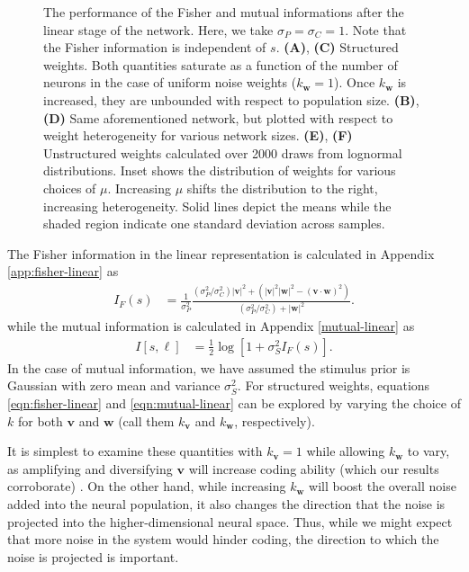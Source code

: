 \documentclass[12pt]{article}
\begin{document}
\begin{figure}[h]
	\caption{The performance of the Fisher and mutual informations after the linear stage of the network. Here, we take $\sigma_P = \sigma_C=1$. Note that the Fisher information is independent of $s$. \textbf{(A)}, \textbf{(C)} Structured weights. Both quantities saturate as a function of the number of neurons in the case of uniform noise weights ($k_{\mathbf{w}}=1$). Once $k_{\mathbf{w}}$ is increased, they are unbounded with respect to population size. \textbf{(B)}, \textbf{(D)} Same aforementioned network, but plotted with respect to weight heterogeneity for various network sizes. \textbf{(E)}, \textbf{(F)} Unstructured weights calculated over 2000 draws from lognormal distributions. Inset shows the distribution of weights for various choices of $\mu$. Increasing $\mu$ shifts the distribution to the right, increasing heterogeneity. Solid lines depict the means while the shaded region indicate one standard deviation across samples.}\label{fig:struct-linear}
\end{figure}
	
	The Fisher information in the linear representation is calculated in Appendix \ref{app:fisher-linear} as 
	\begin{align}
	I_F(s) &= \frac{1}{\sigma_P^2}\frac{\left(\sigma_P^2/\sigma_C^2\right) |\mathbf{v}|^2 +  \left(|\mathbf{v}|^2|\mathbf{w}|^2 - (\mathbf{v}\cdot\mathbf{w})^2\right)}{(\sigma_P^2/\sigma_C^2)+ |\mathbf{w}|^2}. \label{eqn:fisher-linear}
	\end{align}
	while the mutual information is calculated in Appendix \ref{mutual-linear} as
	\begin{align}
	I[s, \boldsymbol{\ell}] &= \frac{1}{2} \log \left[1 + \sigma_S^2 I_F(s)\right]. \label{eqn:mutual-linear}
	\end{align}
	In the case of mutual information, we have assumed the stimulus prior is Gaussian with zero mean and variance $\sigma_S^2$. For structured weights, equations \ref{eqn:fisher-linear} and \ref{eqn:mutual-linear} can be explored by varying the choice of $k$ for both $\mathbf{v}$ and $\mathbf{w}$ (call them $k_{\mathbf{v}}$ and $k_{\mathbf{w}}$, respectively).
	
	It is simplest to examine these quantities with $k_{\mathbf{v}}=1$ while allowing $k_{\mathbf{w}}$ to vary, as amplifying and diversifying $\mathbf{v}$ will increase coding ability (which our results corroborate) \cite{Ecker2011}. On the other hand, while increasing $k_{\mathbf{w}}$ will boost the overall noise added into the neural population, it also changes the direction that the noise is projected into the higher-dimensional neural space. Thus, while we might expect that more noise in the system would hinder coding, the direction to which the noise is projected is important. 
	
\end{document}
